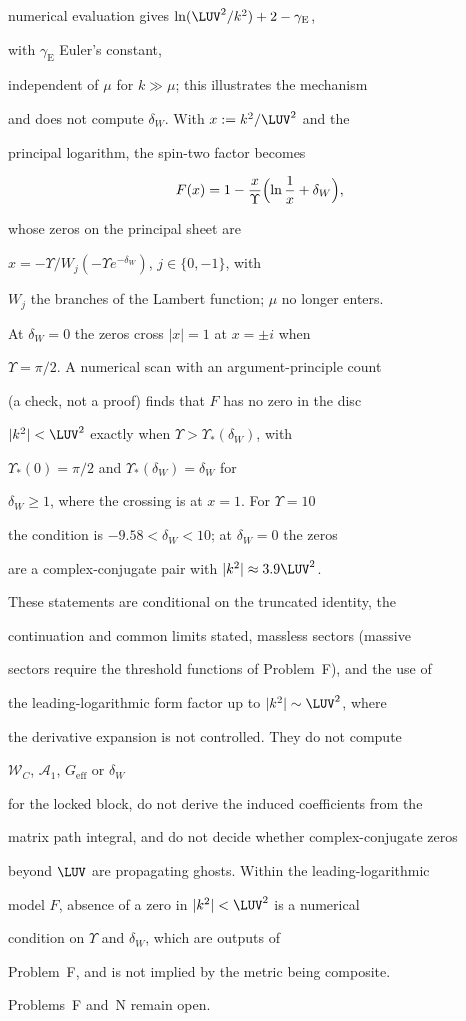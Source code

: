 numerical evaluation gives \(\ln(\LUV^2/k^2)+2-\gamma_{\mathrm E}\),

with \(\gamma_{\mathrm E}\) Euler's constant,

independent of \(\mu\) for \(k\gg\mu\); this illustrates the mechanism

and does not compute \(\delta_W\). With \(x:=k^2/\LUV^2\) and the

principal logarithm, the spin-two factor becomes

\[

  F(x)=1-\frac{x}{\Upsilon}\Bigl(\ln\frac1x+\delta_W\Bigr),

\]

whose zeros on the principal sheet are

\(x=-\Upsilon/W_j(-\Upsilon e^{-\delta_W})\), \(j\in\{0,-1\}\), with

\(W_j\) the branches of the Lambert function; \(\mu\) no longer enters.

At \(\delta_W=0\) the zeros cross \(|x|=1\) at \(x=\pm i\) when

\(\Upsilon=\pi/2\). A numerical scan with an argument-principle count

(a check, not a proof) finds that \(F\) has no zero in the disc

\(|k^2|<\LUV^2\) exactly when \(\Upsilon>\Upsilon_*(\delta_W)\), with

\(\Upsilon_*(0)=\pi/2\) and \(\Upsilon_*(\delta_W)=\delta_W\) for

\(\delta_W\ge1\), where the crossing is at \(x=1\). For \(\Upsilon=10\)

the condition is \(-9.58<\delta_W<10\); at \(\delta_W=0\) the zeros

are a complex-conjugate pair with \(|k^2|\approx3.9\LUV^2\).



These statements are conditional on the truncated identity, the

continuation and common limits stated, massless sectors (massive

sectors require the threshold functions of Problem~F), and the use of

the leading-logarithmic form factor up to \(|k^2|\sim\LUV^2\), where

the derivative expansion is not controlled. They do not compute

\(\mathcal W_C\), \(\mathcal A_1\), \(G_{\mathrm{eff}}\) or \(\delta_W\)

for the locked block, do not derive the induced coefficients from the

matrix path integral, and do not decide whether complex-conjugate zeros

beyond \(\LUV\) are propagating ghosts. Within the leading-logarithmic

model \(F\), absence of a zero in \(|k^2|<\LUV^2\) is a numerical

condition on \(\Upsilon\) and \(\delta_W\), which are outputs of

Problem~F, and is not implied by the metric being composite.

Problems~F and~N remain open.



